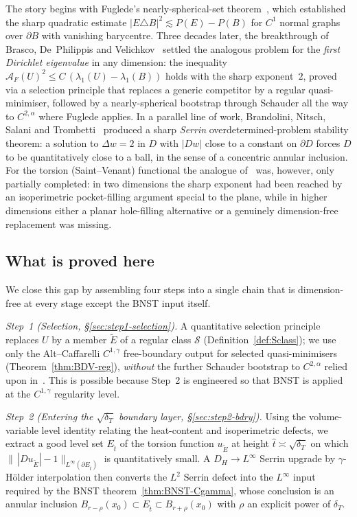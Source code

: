 \documentclass[11pt]{amsart}
\newcommand{\Et}{E_{\hat t}}
\newcommand{\dT}{\delta_T}
\newcommand{\AF}{\mathcal A_F}
\newcommand{\Etil}{\widetilde E}
\newcommand{\Sclass}{\mathcal S}
\begin{document}
The story begins with Fuglede's nearly-spherical-set
theorem~\cite{Fuglede1989}, which established the sharp quadratic
estimate $|E\triangle B|^{2}\lesssim P(E)-P(B)$ for $C^{1}$ normal
graphs over $\partial B$ with vanishing barycentre.  Three decades
later, the breakthrough of Brasco, De~Philippis and
Velichkov~\cite{BDV2015} settled the analogous problem for the
\emph{first Dirichlet eigenvalue} in any dimension: the inequality
$\AF(U)^{2}\le C\,(\lambda_1(U)-\lambda_1(B))$ holds with the sharp
exponent~$2$, proved via a selection principle that replaces a generic
competitor by a regular quasi-minimiser, followed by a nearly-spherical
bootstrap through Schauder all the way to $C^{2,\alpha}$ where Fuglede
applies.  In a parallel line of work, Brandolini, Nitsch, Salani and
Trombetti~\cite{BNST} produced a sharp \emph{Serrin}
overdetermined-problem stability theorem: a solution to $\Delta w=2$
in $D$ with $|Dw|$ close to a constant on $\partial D$ forces $D$ to
be quantitatively close to a ball, in the sense of a concentric
annular inclusion.  For the torsion (Saint--Venant) functional the
analogue of~\cite{BDV2015} was, however, only partially completed: in
two dimensions the sharp exponent had been reached by an isoperimetric
pocket-filling argument special to the plane, while in higher
dimensions either a planar hole-filling alternative or a genuinely
dimension-free replacement was missing.

\subsection*{What is proved here}

We close this gap by assembling four steps into a single chain that
is dimension-free at every stage except the BNST input itself.

\smallskip
\noindent\emph{Step~1 (Selection, \S\ref{sec:step1-selection}).}
A quantitative selection principle replaces $U$ by a member $\Etil$
of a regular class $\Sclass$ (Definition~\ref{def:Sclass}); we use
only the Alt--Caffarelli $C^{1,\gamma}$ free-boundary output for
selected quasi-minimisers (Theorem~\ref{thm:BDV-reg}), \emph{without}
the further Schauder bootstrap to $C^{2,\alpha}$ relied upon
in~\cite{BDV2015}.  This is possible because Step~2 is engineered so
that BNST is applied at the $C^{1,\gamma}$ regularity level.

\smallskip
\noindent\emph{Step~2 (Entering the $\sqrt{\dT}$ boundary layer,
\S\ref{sec:step2-bdry}).}  Using the volume-variable level identity
relating the heat-content and isoperimetric defects, we extract a
good level set $\Et$ of the torsion function $u_{\Etil}$ at height
$\hat t\asymp\sqrt{\dT}$ on which $\|\,|Du_{\Etil}|-1\|_{L^{\infty}
(\partial\Et)}$ is quantitatively small.  A $D_H\to L^\infty$ Serrin
upgrade by $\gamma$-Hölder interpolation then converts the $L^{2}$
Serrin defect into the $L^{\infty}$ input required by the BNST
theorem~\eqref{thm:BNST-Cgamma}, whose conclusion is an annular
inclusion $B_{r-\rho}(x_0)\subset \Et\subset B_{r+\rho}(x_0)$ with
$\rho$ an explicit power of $\dT$.
\end{document}
